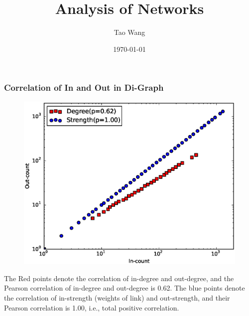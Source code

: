 \documentclass{beamer}
\title[Experimental Results]{Analysis of Networks} %
\author{Tao Wang} %
\institute[Soton] %
{
University of Southampton \\ %
\medskip
\textit{t.wang@soton.ac.uk} %
}
\date{\today} %
\begin{document}
\begin{frame}
\titlepage %
\end{frame}



%

\begin{frame}
\frametitle{Correlation of In and Out in Di-Graph}
\begin{figure}
\includegraphics[width=0.65\linewidth]{in_out.eps}
\end{figure}
\small{The Red points denote the correlation of in-degree and out-degree, and the Pearson correlation of in-degree and out-degree is 0.62. The blue points denote the correlation of in-strength (weights of link) and out-strength, and their Pearson correlation is 1.00, i.e., total positive correlation.}
\end{frame}
\end{document}
